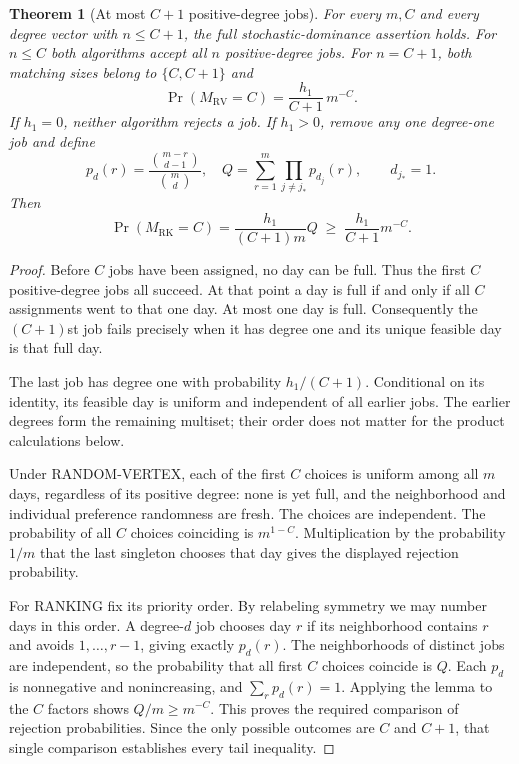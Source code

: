 \documentclass[11pt]{article}
\newtheorem{theorem}{Theorem}
\newcommand{\RV}{\mathrm{RV}}
\newcommand{\RK}{\mathrm{RK}}
\begin{document}
\begin{theorem}[At most $C+1$ positive-degree jobs]
For every $m,C$ and every degree vector with $n\leq C+1$, the full
stochastic-dominance assertion holds. For $n\leq C$ both algorithms
accept all $n$ positive-degree jobs. For $n=C+1$, both matching sizes
belong to $\{C,C+1\}$ and
\[
 \Pr(M_\RV=C)=\frac{h_1}{C+1}\,m^{-C}.
\]
If $h_1=0$, neither algorithm rejects a job. If $h_1>0$, remove any one
degree-one job and define
\[
 p_d(r)=\frac{\binom{m-r}{d-1}}{\binom md},\quad
 Q=\sum_{r=1}^m\prod_{j\ne j_*}p_{d_j}(r),\qquad d_{j_*}=1.
\]
Then
\[
 \Pr(M_\RK=C)=\frac{h_1}{(C+1)m}Q
 \;\geq\;\frac{h_1}{C+1}m^{-C}.
\]
\end{theorem}
\begin{proof}
Before $C$ jobs have been assigned, no day can be full. Thus the first
$C$ positive-degree jobs all succeed. At that point a day is full if and
only if all $C$ assignments went to that one day. At most one day is full.
Consequently the $(C+1)$st job fails precisely when it has degree one
and its unique feasible day is that full day.

The last job has degree one with probability $h_1/(C+1)$. Conditional
on its identity, its feasible day is uniform and independent of all
earlier jobs. The earlier degrees form the remaining multiset; their
order does not matter for the product calculations below.

Under RANDOM-VERTEX, each of the first $C$ choices is uniform among all
$m$ days, regardless of its positive degree: none is yet full, and the
neighborhood and individual preference randomness are fresh. The choices
are independent. The probability of all $C$ choices coinciding is
$m^{1-C}$. Multiplication by the probability $1/m$ that the last
singleton chooses that day gives the displayed rejection probability.

For RANKING fix its priority order. By relabeling symmetry we may number
days in this order. A degree-$d$ job chooses day $r$ if its neighborhood
contains $r$ and avoids $1,\ldots,r-1$, giving exactly $p_d(r)$.
The neighborhoods of distinct jobs are independent, so the probability
that all first $C$ choices coincide is $Q$. Each $p_d$ is nonnegative
and nonincreasing, and $\sum_r p_d(r)=1$. Applying the lemma to the
$C$ factors shows $Q/m\geq m^{-C}$. This proves the required comparison
of rejection probabilities. Since the only possible outcomes are $C$
and $C+1$, that single comparison establishes every tail inequality.
\end{proof}
\end{document}
